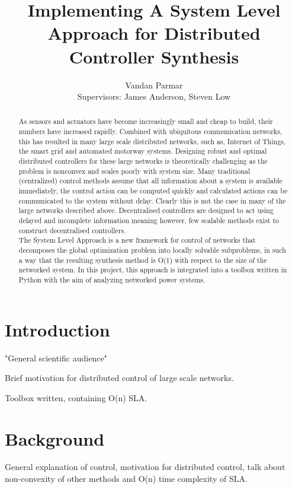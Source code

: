 \documentclass[11pt,a4paper]{article}
\begin{document}
\title{Implementing A System Level Approach for Distributed Controller Synthesis}
\author{Vandan Parmar \\
Supervisors: James Anderson, Steven Low}
\maketitle
\vspace{100pt}
\begin{abstract}
As sensors and actuators have become increasingly small and cheap to build, their numbers have increased rapidly. Combined with ubiquitous communication networks, this has resulted in many large scale distributed networks, such as, Internet of Things, the smart grid and automated motorway systems. Designing robust and optimal distributed controllers for these large networks is theoretically challenging as the problem is nonconvex and scales poorly with system size. Many traditional (centralized) control methods assume that all information about a system is available immediately, the control action can be computed quickly and calculated actions can be communicated to the system without delay. Clearly this is not the case in many of the large networks described above. Decentralised controllers are designed to act using delayed and incomplete information meaning however, few scalable methods exist to construct decentralised controllers. \\ \indent The System Level Approach is a new framework for control of networks that decomposes the global optimization problem into locally solvable subproblems, in such a way that the resulting synthesis method is O(1) with respect to the size of the networked system. In this project, this approach is integrated into a toolbox written in Python with the aim of analyzing networked power systems.
\end{abstract}

\pagebreak
\section{Introduction}
"General scientific audience"

Brief motivation for distributed control of large scale networks. 

Toolbox written, containing O(n) SLA.
\section{Background}
General explanation of control, motivation for distributed control, talk about non-convexity of other methods and O(n) time complexity of SLA.
\end{document}
